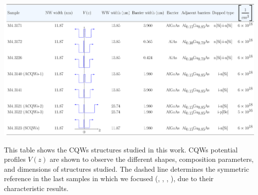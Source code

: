 \begin{table}
	\begin{table}[H]
		\centering
		\includegraphics[width=\textwidth]{../tables/chapter-3/table-1-samples/out/table-1-samples.pdf}
		\caption[Table of samples description]{This table shows the CQWs structures studied in this work.  CQWs potential profiles $V(z)$ are shown to observe the different shapes, composition parameters, and dimensions of structures studied. The dashed line determines the symmetric reference in the last samples in which we focused (\tucu, \tcvu, \tcvd, \tcvt), due to their characteristic results. }
		\label{tab:chapter3:Samples description} 
	\end{table}
\end{table}

